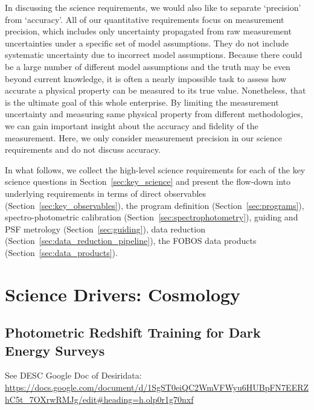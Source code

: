 \documentclass[11pt,a4paper,twoside,onecolumn,openany,final,oldfontcommands]{memoir}
\begin{document}
In discussing the science requirements, we would also like to separate `precision' from `accuracy'. All of our quantitative requirements focus on measurement precision, which includes only uncertainty propagated from raw measurement uncertainties under a specific set of model assumptions. They do not include systematic uncertainty due to incorrect model assumptions. Because there could be a large number of different model assumptions and the truth may be even beyond current knowledge, it is often a nearly impossible task to assess how accurate a physical property can be measured to its true value. Nonetheless, that is the ultimate goal of this whole enterprise. By limiting the measurement uncertainty and measuring same physical property from different methodologies, we can gain important insight about the accuracy and fidelity of the measurement. Here, we only consider measurement precision in our science requirements and do not discuss accuracy.

In what follows, we collect the high-level science requirements for each of the key science questions in Section~\ref{sec:key_science} and present the flow-down into underlying requirements in terms of direct observables (Section~\ref{sec:key_observables}), the program definition (Section~\ref{sec:programs}), spectro-photometric calibration (Section~\ref{sec:spectrophotometry}), guiding and PSF metrology (Section~\ref{sec:guiding}), data reduction (Section~\ref{sec:data_reduction_pipeline}), the FOBOS data products (Section~\ref{sec:data_products}).


\newpage


\chapter{Science Drivers: Cosmology} \label{sci:cosmology}

\section{Photometric Redshift Training for Dark Energy Surveys}
\label{sci:photoz}

See DESC Google Doc of Desiridata: \url{https://docs.google.com/document/d/1SgST0eiQC2WmVFWyu6HUBpFN7EERZhC5t\_7OXrwRMJg/edit\#heading=h.olp0r1g70nxf}
\end{document}
